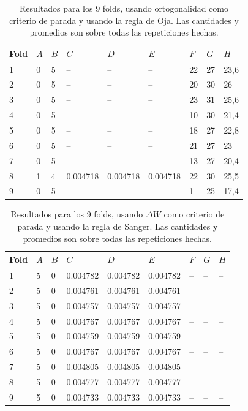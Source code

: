 \documentclass[informe.tex]{subfiles}
\begin{document}
	
	\begin{table}[H]
	  \centering
	  \begin{tabular}{|l|l|l|l|l|l|l|l|l|} \hline
	  Fold & $A$ & $B$ & $C$ & $D$ & $E$ & $F$ & $G$ & $H$ \\ \hline
	  1& 0 & 5 & -- & -- & -- & 22 & 27 & 23,6 \\ \hline
	  2& 0 & 5 & -- & -- & -- & 20 & 30 & 26 \\ \hline
	  3& 0 & 5 & -- & -- & -- & 23 & 31 & 25,6 \\ \hline
	  4& 0 & 5 & -- & -- & -- & 10 & 30 & 21,4 \\ \hline
	  5& 0 & 5 & -- & -- & -- & 18 & 27 & 22,8 \\ \hline
	  6& 0 & 5 & -- & -- & -- & 21 & 27 & 23 \\ \hline
	  7& 0 & 5 & -- & -- & -- & 13 & 27 & 20,4 \\ \hline
	  8& 1 & 4 & 0.004718 & 0.004718 & 0.004718 & 22 & 30 & 25,5 \\ \hline
	  9& 0 & 5 & -- & -- & -- & 1 & 25 & 17,4 \\ \hline
	  \end{tabular}
	  \caption{Resultados para los 9 folds, usando ortogonalidad como criterio de parada y usando la regla de Oja. Las cantidades y promedios son sobre todas las repeticiones hechas.}
	  \label{tab:ortogonalidad_oja500}
	\end{table}

	
	\begin{table}[H]
	  \centering
	  \begin{tabular}{|l|l|l|l|l|l|l|l|l|} \hline
	  Fold & $A$ & $B$ & $C$ & $D$ & $E$ & $F$ & $G$ & $H$ \\ \hline
	  1& 5 & 0 & 0.004782 & 0.004782 & 0.004782 & -- & -- & -- \\ \hline
	  2& 5 & 0 & 0.004761 & 0.004761 & 0.004761 & -- & -- & -- \\ \hline
	  3& 5 & 0 & 0.004757 & 0.004757 & 0.004757 & -- & -- & -- \\ \hline
	  4& 5 & 0 & 0.004767 & 0.004767 & 0.004767 & -- & -- & -- \\ \hline
	  5& 5 & 0 & 0.004759 & 0.004759 & 0.004759 & -- & -- & -- \\ \hline
	  6& 5 & 0 & 0.004767 & 0.004767 & 0.004767 & -- & -- & -- \\ \hline
	  7& 5 & 0 & 0.004805 & 0.004805 & 0.004805 & -- & -- & -- \\ \hline
	  8& 5 & 0 & 0.004777 & 0.004777 & 0.004777 & -- & -- & -- \\ \hline
	  9& 5 & 0 & 0.004733 & 0.004733 & 0.004733 & -- & -- & -- \\ \hline
	  \end{tabular}
	  \caption{Resultados para los 9 folds, usando $\Delta W$ como criterio de parada y usando la regla de Sanger. Las cantidades y promedios son sobre todas las repeticiones hechas.}
	  \label{tab:pesos_sanger500}
	\end{table}      
	
\end{document}
